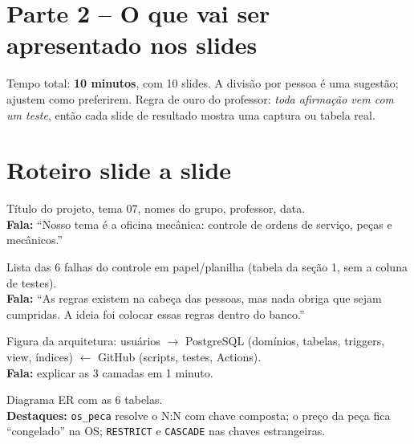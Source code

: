 \documentclass[a4paper,11pt]{article}
\newcommand{\cod}[1]{\texttt{\small #1}}
\begin{document}
\newpage
\section*{Parte 2 -- O que vai ser apresentado nos slides}

Tempo total: \textbf{10 minutos}, com 10 slides. A divisão por pessoa é uma sugestão;
ajustem como preferirem. Regra de ouro do professor: \emph{toda afirmação vem com um teste},
então cada slide de resultado mostra uma captura ou tabela real.

\setcounter{section}{7}
\section{Roteiro slide a slide}

\newcommand{\slide}[4]{%
\begin{caixa}[title={\textbf{Slide #1 -- #2}\hfill #3}]
#4
\end{caixa}\vspace{2pt}}

\slide{1}{Capa}{0:00--0:20 \textbullet{} Jarlisson}{
Título do projeto, tema 07, nomes do grupo, professor, data.\\
\textbf{Fala:} ``Nosso tema é a oficina mecânica: controle de ordens de serviço, peças e mecânicos.''}

\slide{2}{O problema}{0:20--1:20 \textbullet{} Jarlisson}{
Lista das 6 falhas do controle em papel/planilha (tabela da seção 1, sem a coluna de testes).\\
\textbf{Fala:} ``As regras existem na cabeça das pessoas, mas nada obriga que sejam cumpridas. A ideia foi colocar essas regras dentro do banco.''}

\slide{3}{Arquitetura da solução}{1:20--2:20 \textbullet{} Jarlisson}{
Figura da arquitetura: usuários $\rightarrow$ PostgreSQL (domínios, tabelas, triggers, view, índices) $\leftarrow$ GitHub (scripts, testes, Actions).\\
\textbf{Fala:} explicar as 3 camadas em 1 minuto.}

\slide{4}{Modelo de dados (DER)}{2:20--3:20 \textbullet{} Brunno}{
Diagrama ER com as 6 tabelas.\\
\textbf{Destaques:} \cod{os\_peca} resolve o N:N com chave composta; o preço da peça fica ``congelado'' na OS; \cod{RESTRICT} e \cod{CASCADE} nas chaves estrangeiras.}
\end{document}
